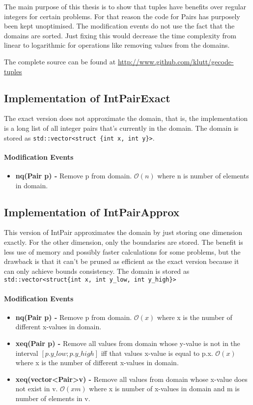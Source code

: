 \documentclass[a4paper,11pt]{article}
\begin{document}
The main purpose of this thesis is to show that tuples have benefits over regular integers for certain problems. For that reason the code for Pairs has purposely been kept unoptimised. The modification events do not use the fact that the domains are sorted. Just fixing this would decrease the time complexity from linear to logarithmic for operations like removing values from the domains.

The complete source can be found at \url{http://www.github.com/klutt/gecode-tuples}

\subsection{Implementation of IntPairExact}
The exact version does not approximate the domain, that is, the implementation is a long list of all integer pairs that's currently in the domain. The domain is stored as \texttt{std::vector<struct \{int x, int y\}>}. 

\paragraph{Modification Events}
\begin{itemize}
\item {\textbf{nq(Pair p) - }} Remove p from domain. $\mathcal{O}(n)$ where n is number of elements in domain.
\end{itemize}
\subsection{Implementation of IntPairApprox}
This version of IntPair approximates the domain by just storing one dimension exactly. For the other dimension, only the boundaries are stored. The benefit is less use of memory and possibly faster calculations for some problems, but the drawback is that it can't be pruned as efficient as the exact version because it can only achieve bounds consistency. The domain is stored as \texttt{std::vector<struct\{int x, int y\_low, int y\_high\}>}

\paragraph{Modification Events}
\begin{itemize}
\item {\textbf{nq(Pair p) - }} Remove p from domain. $\mathcal{O}(x)$ where x is the number of different x-values in domain.
\item{\textbf{xeq(Pair p) - }} Remove all values from domain whose y-value is not in the interval $[p.y\_low; p.y\_high]$ iff that values x-value is equal to p.x. $\mathcal{O}(x)$ where x is the number of different x-values in domain.
\item{\textbf{xeq(vector\textless Pair\textgreater v) - }} Remove all values from domain whose x-value does not exist in v. $\mathcal{O}(xm)$ where x is number of x-values in domain and m is number of elements in v.
\end{itemize}
\end{document}
